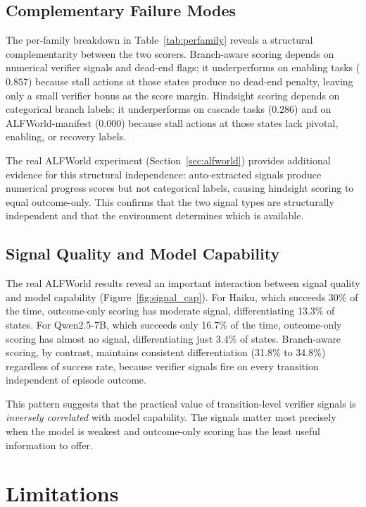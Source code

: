 \documentclass[11pt]{article}
\begin{document}
\subsection{Complementary Failure Modes}
\label{sec:complementary}

The per-family breakdown in Table~\ref{tab:perfamily} reveals a structural complementarity between the two scorers. Branch-aware scoring depends on numerical verifier signals and dead-end flags; it underperforms on enabling tasks ($0.857$) because stall actions at those states produce no dead-end penalty, leaving only a small verifier bonus as the score margin. Hindsight scoring depends on categorical branch labels; it underperforms on cascade tasks ($0.286$) and on ALFWorld-manifest ($0.000$) because stall actions at those states lack pivotal, enabling, or recovery labels.

The real ALFWorld experiment (Section~\ref{sec:alfworld}) provides additional evidence for this structural independence: auto-extracted signals produce numerical progress scores but not categorical labels, causing hindsight scoring to equal outcome-only. This confirms that the two signal types are structurally independent and that the environment determines which is available.

\subsection{Signal Quality and Model Capability}

The real ALFWorld results reveal an important interaction between signal quality and model capability (Figure~\ref{fig:signal_cap}). For Haiku, which succeeds 30\% of the time, outcome-only scoring has moderate signal, differentiating 13.3\% of states. For Qwen2.5-7B, which succeeds only 16.7\% of the time, outcome-only scoring has almost no signal, differentiating just 3.4\% of states. Branch-aware scoring, by contrast, maintains consistent differentiation (31.8\% to 34.8\%) regardless of success rate, because verifier signals fire on every transition independent of episode outcome.

This pattern suggests that the practical value of transition-level verifier signals is \emph{inversely correlated} with model capability. The signals matter most precisely when the model is weakest and outcome-only scoring has the least useful information to offer.

\section{Limitations}
\end{document}
